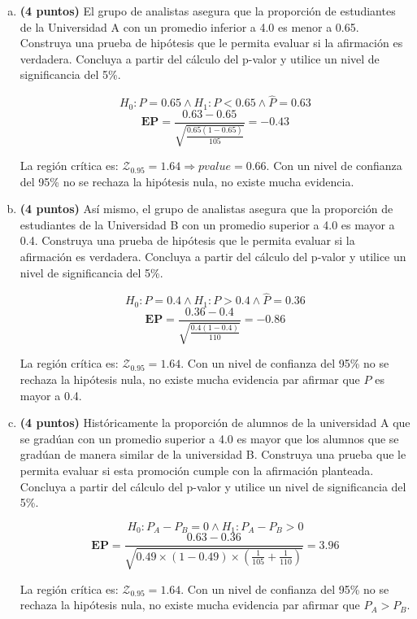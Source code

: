 \documentclass[../main.tex]{subfiles}
\begin{document}
\begin{enumerate}[(a)]

\item \textbf{(4 puntos)} El grupo de analistas asegura que la proporción de estudiantes de la Universidad A con un promedio inferior a 4.0 es menor a 0.65. Construya una prueba de hipótesis que le permita evaluar si la afirmación es verdadera. Concluya a partir del cálculo del p-valor y utilice un nivel de significancia del 5\%.

$$H_0 : P = 0.65 \wedge H_1 : P < 0.65 \wedge \hat{P} = 0.63$$
$$\textbf{EP} = \frac{0.63 - 0.65}{\sqrt{\frac{0.65(1-0.65)}{105}}} = -0.43$$

La región crítica es: $\mathcal{Z}_{0.95} = 1.64 \Rightarrow pvalue = 0.66$. Con un nivel de confianza del 95\% no se rechaza la hipótesis nula, no existe mucha evidencia.

\item \textbf{(4 puntos)} Así mismo, el grupo de analistas asegura que la proporción de estudiantes de la Universidad B con un promedio superior a 4.0 es mayor a 0.4. Construya una prueba de hipótesis que le permita evaluar si la afirmación es verdadera. Concluya a partir del cálculo del p-valor y utilice un nivel de significancia del 5\%.

$$H_0 : P = 0.4 \wedge H_1 : P > 0.4 \wedge \hat{P} = 0.36$$
$$\textbf{EP} = \frac{0.36 - 0.4}{\sqrt{\frac{0.4(1-0.4)}{110}}} = -0.86$$

La región crítica es: $\mathcal{Z}_{0.95} = 1.64$. Con un nivel de confianza del 95\% no se rechaza la hipótesis nula, no existe mucha evidencia par afirmar que $P$ es mayor a 0.4.

\item \textbf{(4 puntos)} Históricamente la proporción de alumnos de la universidad A que se gradúan con un promedio superior a 4.0 es mayor que los alumnos que se gradúan de manera similar de la universidad B. Construya una prueba que le permita evaluar si esta promoción cumple con la afirmación planteada. Concluya a partir del cálculo del p-valor y utilice un nivel de
significancia del 5\%.

$$H_0 : P_A - P_B = 0 \wedge H_1 : P_A - P_B > 0$$
$$\textbf{EP} = \frac{0.63 - 0.36}{\sqrt{0.49 \times (1 - 0.49)\times \left( \frac{1}{105} + \frac{1}{110}\right)}} = 3.96$$

La región crítica es: $\mathcal{Z}_{0.95} = 1.64$. Con un nivel de confianza del 95\% no se rechaza la hipótesis nula, no existe mucha evidencia par afirmar que $P_A > P_B$.

\end{enumerate}
\end{document}
